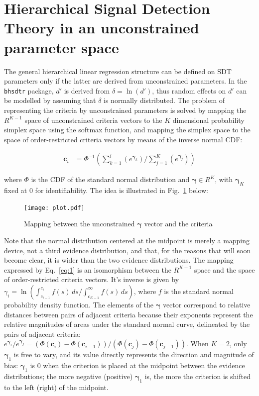 \documentclass[a4paper,man,apacite,floatsintext]{apa6}
\newcommand{\code}[1]{\texttt{#1}}
\begin{document}
\section{Hierarchical Signal Detection Theory in an unconstrained
  parameter space}

The general hierarchical linear regression structure can be defined on
SDT parameters only if the latter are derived from unconstrained
parameters. In the \code{bhsdtr} package, $d'$ is derived from
$\delta = \ln(d')$, thus random effects on $d'$ can be modelled by
assuming that $\delta$ is normally distributed. The problem of
representing the criteria by unconstrained parameters is solved by
mapping the $R^{K-1}$ space of unconstrained criteria vectors to the
$K$ dimensional probability simplex space using the softmax function,
and mapping the simplex space to the space of order-restricted
criteria vectors by means of the inverse normal CDF:

\begin{align}
  \bm{c}_i &= \Phi^{-1}(\sum_{k = 1}^i(e^{\bm{\gamma}_k}) /
             \sum_{j=1}^K(e^{\bm{\gamma}_j}))
\label{eq:1}
\end{align}

\noindent where $\Phi$ is the CDF of the standard normal distribution
and $\bm{\gamma} \in R^K$, with $\bm{\gamma}_K$ fixed at $0$ for
identifiability. The idea is illustrated in Fig.~\ref{fig:2} below:

\begin{figure}[H]
  \centering
  \texttt{[image: plot.pdf]}
  \caption{Mapping between the unconstrained $\bm{\gamma}$ vector and
    the criteria}
  \label{fig:2}
\end{figure}

Note that the normal distribution centered at the midpoint is merely a
mapping device, not a third evidence distribution, and that, for the
reasons that will soon become clear, it is wider than the two evidence
distributions. The mapping expressed by Eq.~\ref{eq:1} is an
isomorphism between the $R^{K-1}$ space and the space of
order-restricted criteria vectors. It's inverse is given by
$\gamma_i =\ln{(\int_{c_{i-1}}^{c_i} f(s) \,ds /
  \int_{c_{K-1}}^{\infty} f(s) \, ds)}$, where $f$ is the standard
normal probability density function. The elements of the $\bm{\gamma}$
vector correspond to relative distances between pairs of adjacent
criteria because their exponents represent the relative magnitudes of
areas under the standard normal curve, delineated by the pairs of
adjacent criteria:
$e^{\bm{\gamma}_i} / e^{\bm{\gamma}_j} = (\Phi(\bm{c}_i) -
\Phi(\bm{c}_{i-1})) / (\Phi(\bm{c}_j) - \Phi(\bm{c}_{j-1}))$. When
$K=2$, only $\bm{\gamma}_1$ is free to vary, and its value directly
represents the direction and magnitude of bias: $\bm{\gamma}_1$ is $0$
when the criterion is placed at the midpoint between the evidence
distributions; the more negative (positive) $\bm{\gamma}_1$ is, the
more the criterion is shifted to the left (right) of the midpoint.
\end{document}
